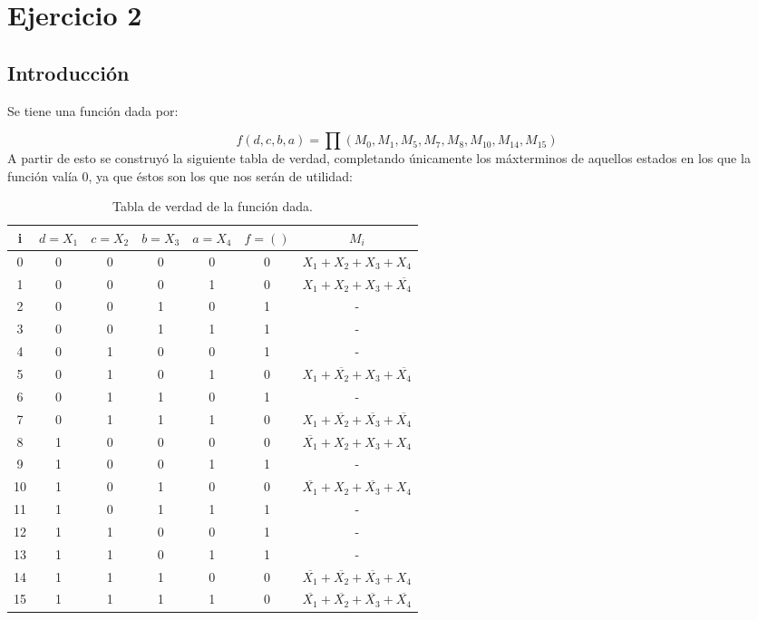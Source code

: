\section{Ejercicio 2}
\subsection{Introducción}
\newcommand\Tstrut{\rule{0pt}{2.4ex}}
Se tiene una función dada por:

\[
	f(d,c,b,a)=\prod\left(M_{0},M_{1},M_{5},M_{7},M_{8},M_{10},M_{14},M_{15}\right)
\]
\vspace{5mm}
A partir de esto se construyó la siguiente tabla de verdad, completando únicamente los máxterminos de aquellos estados en los que la función valía 0, ya que éstos son los que nos serán de utilidad:

\begin{table}[h!]
    \begin{center}
        \begin{tabular}{|c|c|c|c|c|c|c|}
        \hline
        i   & $d=X_1$ & $c=X_2$ & $b=X_3$ & $a=X_4$ & $f=()$ & $M_i$ \\\hline
        0   &  0 & 0 & 0 & 0 & 0 & \(X_{1}+X_{2}+X_{3}+X_{4}\) \\ \hline
        1   &  0 & 0 & 0 & 1 & 0 & \(X_{1}+X_{2}+X_{3}+\overline{X_{4}}\)\Tstrut\\ \hline
        2   &  0 & 0 & 1 & 0 & 1 & -\\ \hline
        3   &  0 & 0 & 1 & 1 & 1 & -\\ \hline
        4   &  0 & 1 & 0 & 0 & 1 & -\\\hline
        5   &  0 & 1 & 0 & 1 & 0 & \(X_{1}+\overline{X_{2}}+X_{3}+\overline{X_{4}}\)\Tstrut\\ \hline
        6   &  0 & 1 & 1 & 0 & 1 & -\\ \hline
        7   &  0 & 1 & 1 & 1 & 0 & \(X_{1}+\overline{X_{2}}+\overline{X_{3}}+\overline{X_{4}}\)\Tstrut\\ \hline
        8   &  1 & 0 & 0 & 0 & 0 & \(\overline{X_{1}}+X_{2}+X_{3}+X_{4}\)\Tstrut\\ \hline
        9   &  1 & 0 & 0 & 1 & 1 & -\\ \hline
        10  &  1 & 0 & 1 & 0 & 0 & \(\overline{X_{1}}+X_{2}+\overline{X_{3}}+X_{4}\)\Tstrut\\ \hline
        11  &  1 & 0 & 1 & 1 & 1 & -\\ \hline
        12  &  1 & 1 & 0 & 0 & 1 & -\\ \hline
        13  &  1 & 1 & 0 & 1 & 1 & -\\ \hline
        14  &  1 & 1 & 1 & 0 & 0 & \(\overline{X_{1}}+\overline{X_{2}}+\overline{X_{3}}+X_{4}\)\Tstrut\\ \hline
        15  &  1 & 1 & 1 & 1 & 0 & \(\overline{X_{1}}+\overline{X_{2}}+\overline{X_{3}}+\overline{X_{4}}\)\Tstrut\\ \hline
        \end{tabular}
    \caption{Tabla de verdad de la función dada.}
    \end{center}
    \label{table:2.1}
\end{table}

